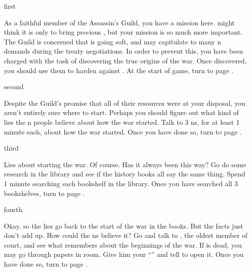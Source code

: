 \documentclass[greennotebook]{NeptuneBall}
\begin{document}
\startnotebook{\nWar{}}

\begin{page}{first}

As a faithful member of the Assassin's Guild, you have a mission here. \cManta{} might think it is only to bring \cManta{\them} \cManta{\their} precious \iHemlock{}, but your mission is so much more important. The Guild is concerned that \cPrince{} is going soft, and may capitulate to many \pAtlantis{}n demands during the treaty negotiations. In order to prevent this, you have been charged with the task of discovering the true origins of the war. Once discovered, you should use them to harden \cPrince{} against \pAtlantis{}. At the start of game, turn to page .

\end{page}

\begin{page}{second}

Despite the Guild's promise that all of their resources were at your disposal, you aren't entirely sure where to start. Perhaps you should figure out what kind of lies the \pAtlantis{}n people believe about how the war started. Talk to 3 \pAtlantis{}ns, for at least 1 minute each, about how the war started. Once you have done so, turn to page .

\end{page}

\begin{page}{third}

Lies about \pPacifica{} starting the war. Of course. Has it always been this way? Go do some research in the library and see if the history books all say the same thing. Spend 1 minute searching each bookshelf in the library. Once you have searched all 3 bookshelves, turn to page .

\end{page}

\begin{page}{fourth}

Okay, so the lies go back to the start of the war in the books. But the facts just don't add up. How could the \pAtlantis{}ns believe it? Go and talk to \cManta{}, the oldest member of court, and see what \cManta{\they} remembers about the beginnings of the war. If \cManta{} is dead, you may go through \cManta{\their} papers in \cManta{\their} room. Give him your ``\mWPacket{\MYname}'' and tell \cManta{\them} to open it. Once you have done so, turn to page .

\end{page}
\end{document}
